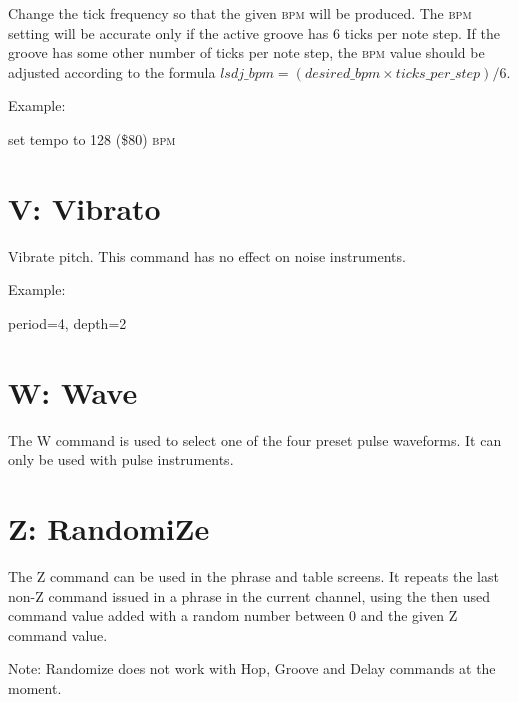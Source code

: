 Change the tick frequency so that the given \textsc{bpm} will be produced. The \textsc{bpm} setting will be accurate only if the active groove has 6 ticks per note step. If the groove has some other number of ticks per note step, the \textsc{bpm} value should be adjusted according to the formula
\begin{math}
lsdj\_bpm = (desired\_bpm \times ticks\_per\_step)/{6}
\end{math}.

\begin{description}
\item Example:
\item[T80] set tempo to 128 (\$80) \textsc{bpm}
\end{description}

\section{V: Vibrato}

Vibrate pitch. This command has no effect on noise instruments.

\begin{description}
\item Example:
\item[V42] period=4, depth=2
\end{description}

\section{W: Wave}

The W command is used to select one of the four preset pulse waveforms. It can only be used with pulse instruments.

\section{Z: RandomiZe}

The Z command can be used in the phrase and table screens. It repeats the last non-Z command issued in a phrase in the current channel, using the then used command value added with a random number between 0 and the given Z command value.

Note: Randomize does not work with Hop, Groove and Delay commands at the moment.
